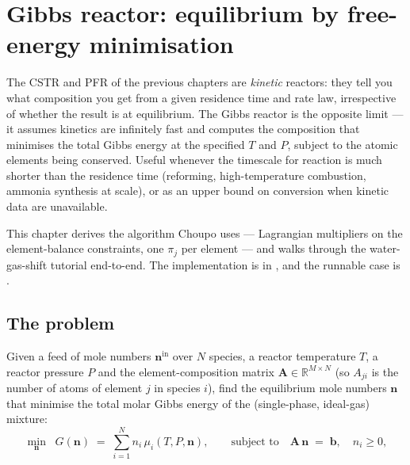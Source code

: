 \documentclass[11pt,a4paper]{article}
\newcommand{\R}{\mathbb{R}}
\begin{document}
\section{Gibbs reactor: equilibrium by free-energy minimisation}\label{ch:gibbs-reactor}

\begin{whatyoulllearn}
The CSTR and PFR of the previous chapters are \emph{kinetic} reactors:
they tell you what composition you get from a given residence time and
rate law, irrespective of whether the result is at equilibrium.  The
Gibbs reactor is the opposite limit --- it assumes kinetics are
infinitely fast and computes the composition that minimises the total
Gibbs energy at the specified $T$ and $P$, subject to the atomic
elements being conserved.  Useful whenever the timescale for reaction
is much shorter than the residence time (reforming, high-temperature
combustion, ammonia synthesis at scale), or as an upper bound on
conversion when kinetic data are unavailable.

This chapter derives the algorithm Choupo uses ---  Lagrangian
multipliers on the element-balance constraints, one $\pi_j$ per
element --- and walks through the water-gas-shift tutorial
end-to-end.  The implementation is in
, and the runnable
case is .
\end{whatyoulllearn}

\subsection{The problem}

Given a feed of mole numbers $\mathbf{n}^{\mathrm{in}}$ over $N$
species, a reactor temperature $T$, a reactor pressure $P$ and the
element-composition matrix $\mathbf{A} \in \R^{M \times N}$ (so
$A_{ji}$ is the number of atoms of element $j$ in species $i$), find
the equilibrium mole numbers $\mathbf{n}$ that minimise the total
molar Gibbs energy of the (single-phase, ideal-gas) mixture:
\begin{equation}
   \min_{\mathbf{n}} \;\; G(\mathbf{n})
   \;=\; \sum_{i=1}^{N} n_i\,\mu_i(T, P, \mathbf{n}),
   \qquad \text{subject to}\quad
   \mathbf{A}\,\mathbf{n} \;=\; \mathbf{b}, \quad n_i \geq 0,
   \label{eq:gibbs-problem}
\end{equation}
\end{document}
